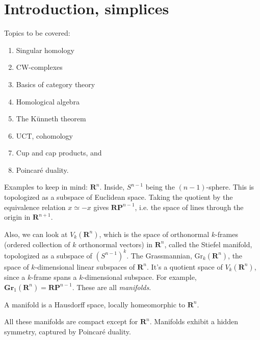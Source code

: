 \section{Introduction, simplices}\label{905}
Topics to be covered:
\begin{enumerate}
    \item Singular homology
    \item CW-complexes
    \item Basics of category theory
    \item Homological algebra
    \item The K\"{u}nneth theorem
    \item UCT, cohomology
    \item Cup and cap products, and
    \item Poincar\'{e} duality.
\end{enumerate}
Examples to keep in mind: $\mathbf{R}^n$. Inside, $S^{n-1}$ being the $(n-1)$-sphere. This is topologized as a subspace of Euclidean space. Taking the quotient by the equivalence relation $x\simeq -x$ gives $\mathbf{RP}^{n-1}$, i.e. the space of lines through the origin in $\mathbf{R}^{n+1}$.

Also, we can look at $V_k(\mathbf{R}^n)$, which is the space of orthonormal $k$-frames (ordered collection of $k$ orthonormal vectors) in $\mathbf{R}^n$, called the Stiefel manifold, topologized as a subspace of $(S^{n-1})^k$. The Grassmannian, $\mathrm{Gr}_k(\mathbf{R}^n)$, the space of $k$-dimensional linear subspaces of $\mathbf{R}^n$. It's a quotient space of $V_k(\mathbf{R}^n)$, since a $k$-frame spans a $k$-dimensional subspace. For example, $\mathbf{Gr}_1(\mathbf{R}^n) = \mathbf{RP}^{n-1}$. These are all \emph{manifolds}.
\begin{definition}
A manifold is a Hausdorff space, locally homeomorphic to $\mathbf{R}^n$.
\end{definition}
All these manifolds are compact except for $\mathbf{R}^n$. Manifolds exhibit a hidden symmetry, captured by Poincar\'{e} duality.

